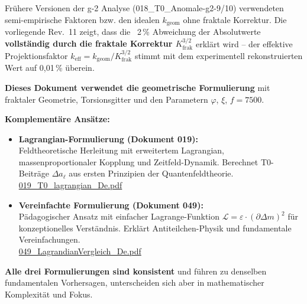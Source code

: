 	
	\begin{tcolorbox}[colback=yellow!10!white, colframe=orange!75!black, title=Hinweis zu älteren Dokumenten]
		Frühere Versionen der g-2 Analyse (018\_T0\_Anomale-g2-9/10) verwendeten semi-empirische Faktoren bzw. den idealen $k_\text{geom}$ ohne fraktale Korrektur. Die vorliegende Rev.~11 zeigt, dass die ~2\,\% Abweichung der Absolutwerte \textbf{vollständig durch die fraktale Korrektur $K_\text{frak}^{3/2}$} erklärt wird – der effektive Projektionsfaktor $k_\text{eff} = k_\text{geom}/K_\text{frak}^{3/2}$ stimmt mit dem experimentell rekonstruierten Wert auf 0{,}01\,\% überein.
	\end{tcolorbox}
	
	\begin{tcolorbox}[colback=blue!10!white, colframe=blue!75!black, title=Alternative Formulierungen der T0-Theorie]
		\textbf{Dieses Dokument verwendet die geometrische Formulierung} mit fraktaler Geometrie, Torsionsgitter und den Parametern $\varphi$, $\xi$, $f = 7500$.
		
		\textbf{Komplementäre Ansätze:}
		\begin{itemize}
			\item \textbf{Lagrangian-Formulierung (Dokument 019):} \\
			Feldtheoretische Herleitung mit erweitertem Lagrangian, massenproportionaler Kopplung und Zeitfeld-Dynamik. Berechnet T0-Beiträge $\Delta a_\ell$ aus ersten Prinzipien der Quantenfeldtheorie. \\
			\rightarrow \href{https://github.com/jpascher/T0-Time-Mass-Duality/blob/main/2/pdf/019_T0_lagrangian_De.pdf}{019\_T0\_lagrangian\_De.pdf}
			
			\item \textbf{Vereinfachte Formulierung (Dokument 049):} \\
			Pädagogischer Ansatz mit einfacher Lagrange-Funktion $\mathcal{L} = \varepsilon \cdot (\partial \Delta m)^2$ für konzeptionelles Verständnis. Erklärt Antiteilchen-Physik und fundamentale Vereinfachungen. \\
			\rightarrow \href{https://github.com/jpascher/T0-Time-Mass-Duality/blob/main/2/pdf/049_LagrandianVergleich_De.pdf}{049\_LagrandianVergleich\_De.pdf}
		\end{itemize}
		
		\textbf{Alle drei Formulierungen sind konsistent} und führen zu denselben fundamentalen Vorhersagen, unterscheiden sich aber in mathematischer Komplexität und Fokus.
	\end{tcolorbox}
	
